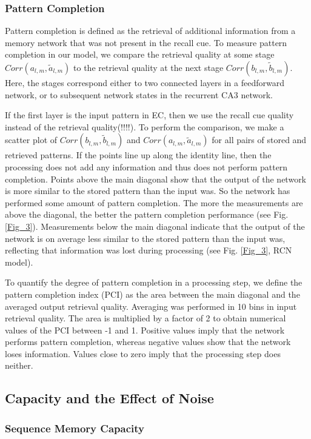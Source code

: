 \documentclass[utf8]{frontiersSCNS} %
\begin{document}
\subsubsection{Pattern Completion}
Pattern completion is defined as the retrieval of additional information from a memory network that was not present in the recall cue. To measure pattern completion in our model, we compare the retrieval quality at some stage $Corr(a_{l, m},\tilde{a}_{l, m})$ to the retrieval quality at the next stage $Corr(b_{l, m},\tilde{b}_{l, m})$. Here, the stages correspond either to two connected layers in a feedforward network, or to subsequent network states in the recurrent CA3 network. 

If the first layer is the input pattern in EC, then we use the recall cue quality instead of the retrieval quality(!!!!).
%
To perform the comparison, we make a scatter plot of
$Corr(b_{l, m},\tilde{b}_{l, m})$ and
$Corr(a_{l, m},\tilde{a}_{l, m})$ 
for all pairs of stored and retrieved patterns.
If the points line up along the identity line, then the processing does not add any information and thus does not perform pattern completion. Points above the main diagonal show that the output of the network is more similar to the stored pattern than the input was. So the network has performed some amount of pattern completion. The more the measurements are above the diagonal, the better the pattern completion performance (see Fig. \ref{Fig_3}). Measurements below the main diagonal indicate that the output of the network is on average less similar to the stored pattern than the input was, reflecting that information was lost during processing (see Fig. \ref{Fig_3}, RCN model).

To quantify the degree of pattern completion in a processing step, we define the pattern completion index (PCI) as the area between the main diagonal and the averaged output retrieval quality. Averaging was performed in 10 bins in input retrieval quality. The area is multiplied by a factor of 2 to obtain numerical values of the PCI between -1 and 1. Positive values imply that the network performs pattern completion, whereas negative values show that the network loses information. Values close to zero imply that the processing step does neither. 


\subsection*{Capacity and the Effect of Noise}

\subsubsection*{Sequence Memory Capacity}
\end{document}
